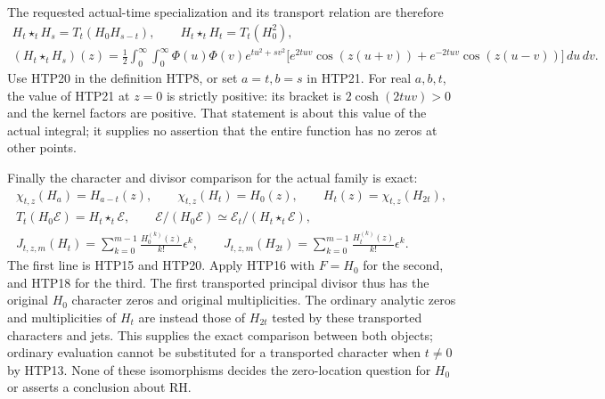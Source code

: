 The requested actual-time specialization and its transport
relation are therefore
\begin{equation}\tag{HTP23}
\begin{gathered}
 H_t\star_tH_s=T_t(H_0H_{s-t}),\qquad
 H_t\star_tH_t=T_t(H_0^2),\\
 (H_t\star_tH_s)(z)=\frac12\int_0^\infty\!\int_0^\infty
 \Phi(u)\Phi(v)e^{tu^2+sv^2}
   \bigl[e^{2tuv}\cos(z(u+v))+e^{-2tuv}\cos(z(u-v))\bigr]\,du\,dv.
\end{gathered}
\end{equation}
Use HTP20 in the definition HTP8, or set $a=t,b=s$ in
HTP21. For real $a,b,t$, the value of HTP21 at $z=0$ is
strictly positive: its bracket is $2\cosh(2tuv)>0$ and
the kernel factors are positive. That statement is about
this value of the actual integral; it supplies no assertion
that the entire function has no zeros at other points.

Finally the character and divisor comparison for the actual
family is exact:
\begin{equation}\tag{HTP24}
\begin{gathered}
 \chi_{t,z}(H_a)=H_{a-t}(z),\qquad
 \chi_{t,z}(H_t)=H_0(z),\qquad H_t(z)=\chi_{t,z}(H_{2t}),\\
 T_t(H_0\mathcal E)=H_t\star_t\mathcal E,\qquad
 \mathcal E/(H_0\mathcal E)
     \simeq\mathcal E_t/(H_t\star_t\mathcal E),\\
 J_{t,z,m}(H_t)=\sum_{k=0}^{m-1}\frac{H_0^{(k)}(z)}{k!}\epsilon^k,
 \qquad
 J_{t,z,m}(H_{2t})=\sum_{k=0}^{m-1}\frac{H_t^{(k)}(z)}{k!}\epsilon^k.
\end{gathered}
\end{equation}
The first line is HTP15 and HTP20. Apply HTP16 with
$F=H_0$ for the second, and HTP18 for the third.
The first transported principal divisor thus has the
original $H_0$ character zeros and original multiplicities.
The ordinary analytic zeros and multiplicities of $H_t$
are instead those of $H_{2t}$ tested by these transported
characters and jets. This supplies the exact comparison
between both objects; ordinary evaluation cannot be
substituted for a transported character when $t\ne0$ by
HTP13. None of these isomorphisms decides the zero-location
question for $H_0$ or asserts a conclusion about RH.

